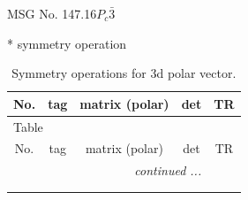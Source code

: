 \documentclass[fleqn,8pt]{jsarticle}
\begin{document}
\setcounter{MaxMatrixCols}{32}

\renewcommand{\tablename}{Table~}
\renewcommand{\figurename}{Figure~}
\begin{center}
\LARGE
MSG No. 147.16\quad$P_{c}\bar{3}$
\end{center}
* symmetry operation
\renewcommand{\arraystretch}{1.3}
\begin{longtable}{ccccc}
\caption{Symmetry operations for 3d polar vector.}
 \\
 \hline \hline
No. & tag & matrix (polar) & det & TR \\ \hline \endfirsthead

\multicolumn{4}{l}{\tablename\ \thetable{}} \\
 \hline \hline
No. & tag & matrix (polar) & det & TR \\ \hline \endhead

 \hline \hline
\multicolumn{4}{r}{\footnotesize\it continued ...} \\ \endfoot

 \hline \hline
\multicolumn{4}{r}{} \\ \endlastfoot


\end{longtable}
\end{document}
